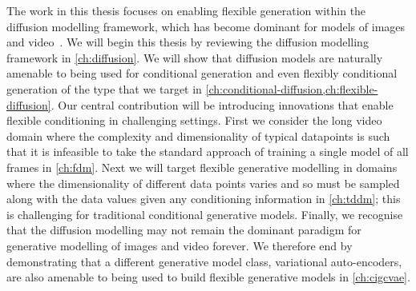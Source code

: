 The work in this thesis focuses on enabling flexible generation within the diffusion modelling framework, which has become dominant for models of images and video~\citep{sohl2015deep,ho2020denoising,dhariwal2021diffusion,rombach2022high,ho2022imagen,peebles2022scalable,brooks2024video}. We will begin this thesis by reviewing the diffusion modelling framework in \cref{ch:diffusion}. We will show that diffusion models are naturally amenable to being used for conditional generation and even flexibly conditional generation of the type that we target in \cref{ch:conditional-diffusion,ch:flexible-diffusion}. Our central contribution will be introducing innovations that enable flexible conditioning in challenging settings. First we consider the long video domain where the complexity and dimensionality of typical datapoints is such that it is infeasible to take the standard approach of training a single model of all frames in \cref{ch:fdm}. Next we will target flexible generative modelling in domains where the dimensionality of different data points varies and so must be sampled along with the data values given any conditioning information in \cref{ch:tddm}; this is challenging for traditional conditional generative models. Finally, we recognise that the diffusion modelling may not remain the dominant paradigm for generative modelling of images and video forever. We therefore end by demonstrating that a different generative model class, variational auto-encoders, are also amenable to being used to build flexible generative models in \cref{ch:cigcvae}.

